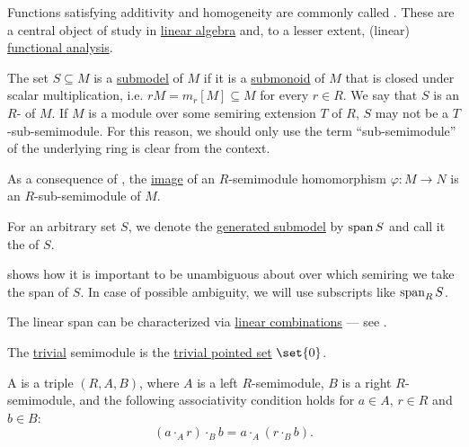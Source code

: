 \begin{definition}
\begin{thmenum}[resume=def:semimodule]
    Functions satisfying additivity and homogeneity are commonly called . These are a central object of study in \hyperref[sec:linear_algebra]{linear algebra} and, to a lesser extent, (linear) \hyperref[sec:functional_analysis]{functional analysis}.

     The set \( S \subseteq M \) is a \hyperref[thm:substructure_is_model]{submodel} of \( M \) if it is a \hyperref[def:monoid/submodel]{submonoid} of \( M \) that is closed under scalar multiplication, i.e. \( rM = m_r[M] \subseteq M \) for every \( r \in R \). We say that \( S \) is an \( R \)- of \( M \). If \( M \) is a module over some semiring extension \( T \) of \( R \), \( S \) may not be a \( T \)-sub-semimodule. For this reason, we should only use the term \enquote{sub-semimodule} of the underlying ring is clear from the context.

    As a consequence of , the \hyperref[def:multi_valued_function/image]{image} of an \( R \)-semimodule homomorphism \( \varphi: M \to N \) is an \( R \)-sub-semimodule of \( M \).

    For an arbitrary set \( S \), we denote the \hyperref[def:first_order_generated_substructure]{generated submodel} by \( \operatorname{span}{ S } \) and call it the  of \( S \).

     shows how it is important to be unambiguous about over which semiring we take the span of \( S \). In case of possible ambiguity, we will use subscripts like \( \operatorname{span}_R S \).

    The linear span can be characterized via \hyperref[def:linear_combination]{linear combinations} --- see .

     The \hyperref[thm:substructures_form_complete_lattice/bottom]{trivial} semimodule is the \hyperref[def:pointed_set/trivial]{trivial pointed set} \( \set{ 0 } \).

     A  is a triple \( (R, A, B) \), where \( A \) is a left \( R \)-semimodule, \( B \) is a right \( R \)-semimodule, and the following associativity condition holds for \( a \in A \), \( r \in R \) and \( b \in B \):
    \begin{equation}\label{eq:def:semimodule/bimodule/associativity}
      (a \cdot_A r) \cdot_B b = a \cdot_A (r \cdot_B b).
    \end{equation}


\end{thmenum}
\end{definition}
